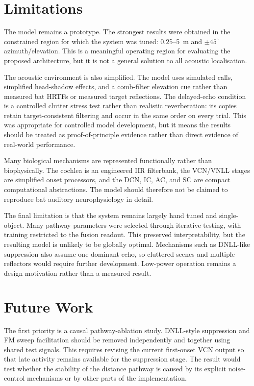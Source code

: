 \section{Limitations}

The model remains a prototype. The strongest results were obtained in the constrained region for which the system was tuned: 0.25--5~m and $\pm45^\circ$ azimuth/elevation. This is a meaningful operating region for evaluating the proposed architecture, but it is not a general solution to all acoustic localisation.

The acoustic environment is also simplified. The model uses simulated calls, simplified head-shadow effects, and a comb-filter elevation cue rather than measured bat HRTFs or measured target reflections. The delayed-echo condition is a controlled clutter stress test rather than realistic reverberation: its copies retain target-consistent filtering and occur in the same order on every trial. This was appropriate for controlled model development, but it means the results should be treated as proof-of-principle evidence rather than direct evidence of real-world performance.

Many biological mechanisms are represented functionally rather than biophysically. The cochlea is an engineered IIR filterbank, the VCN/VNLL stages are simplified onset processors, and the DCN, IC, AC, and SC are compact computational abstractions. The model should therefore not be claimed to reproduce bat auditory neurophysiology in detail.

The final limitation is that the system remains largely hand tuned and single-object. Many pathway parameters were selected through iterative testing, with training restricted to the fusion readout. This preserved interpretability, but the resulting model is unlikely to be globally optimal. Mechanisms such as DNLL-like suppression also assume one dominant echo, so cluttered scenes and multiple reflectors would require further development. Low-power operation remains a design motivation rather than a measured result.

\section{Future Work}

The first priority is a causal pathway-ablation study. DNLL-style suppression and FM sweep facilitation should be removed independently and together using shared test signals. This requires revising the current first-onset VCN output so that late activity remains available for the suppression stage. The result would test whether the stability of the distance pathway is caused by its explicit noise-control mechanisms or by other parts of the implementation.

